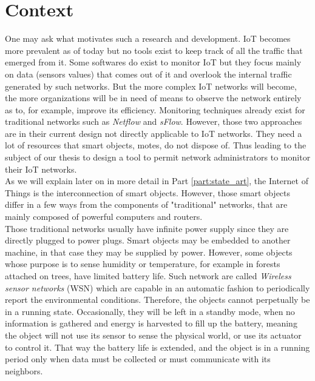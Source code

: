 \section*{Context}

One may ask what motivates such a research and development. IoT becomes more prevalent as of today but no tools exist to keep track of all the traffic that emerged from it. Some softwares do exist to monitor IoT but they focus mainly on data (sensors values) that comes out of it and overlook the internal traffic generated by such networks. But the more complex IoT networks will become, the more organizations will be in need of means to observe the network entirely as to, for example, improve its efficiency. Monitoring techniques already exist for traditional networks such as \textit{Netflow} and \textit{sFlow}. However, those two approaches are in their current design not directly applicable to IoT networks. They need a lot of resources that smart objects, motes, do not dispose of. Thus leading to the subject of our thesis to design a tool to permit network administrators to monitor their IoT networks.\\

As we will explain later on in more detail in Part \ref{part:state_art}, the Internet of Things is the interconnection of smart objects. However, those smart objects differ in a few ways from the components of "traditional" networks, that are mainly composed of powerful computers and routers.\\

Those traditional networks usually have infinite power supply since they are directly plugged to power plugs. Smart objects may be embedded to another machine, in that case they may be supplied by power. However, some objects whose purpose is to sense humidity or temperature, for example in forests attached on trees, have limited battery life.  Such network are called \textit{Wireless sensor networks} (WSN) which are capable in an automatic fashion to periodically report the environmental conditions. Therefore, the objects cannot perpetually be in a running state. Occasionally, they will be left in a standby mode, when no information is gathered and energy is harvested to fill up the battery, meaning the object will not use its sensor to sense the physical world, or use its actuator to control it. That way the battery life is extended, and the object is in a running period only when data must be collected or must communicate with its neighbors. \\

